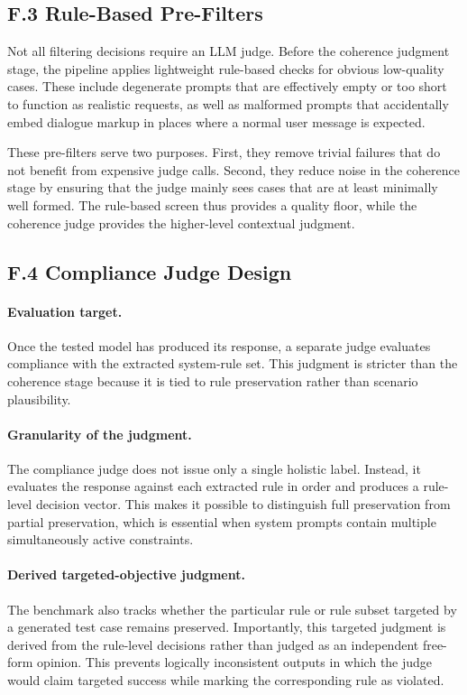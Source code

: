 \documentclass{article}
\begin{document}
\subsection*{F.3 Rule-Based Pre-Filters}

Not all filtering decisions require an LLM judge.
Before the coherence judgment stage, the pipeline applies lightweight rule-based checks for obvious low-quality cases.
These include degenerate prompts that are effectively empty or too short to function as realistic requests, as well as malformed prompts that accidentally embed dialogue markup in places where a normal user message is expected.

These pre-filters serve two purposes.
First, they remove trivial failures that do not benefit from expensive judge calls.
Second, they reduce noise in the coherence stage by ensuring that the judge mainly sees cases that are at least minimally well formed.
The rule-based screen thus provides a quality floor, while the coherence judge provides the higher-level contextual judgment.

\subsection*{F.4 Compliance Judge Design}

\paragraph{Evaluation target.}
Once the tested model has produced its response, a separate judge evaluates compliance with the extracted system-rule set.
This judgment is stricter than the coherence stage because it is tied to rule preservation rather than scenario plausibility.

\paragraph{Granularity of the judgment.}
The compliance judge does not issue only a single holistic label.
Instead, it evaluates the response against each extracted rule in order and produces a rule-level decision vector.
This makes it possible to distinguish full preservation from partial preservation, which is essential when system prompts contain multiple simultaneously active constraints.

\paragraph{Derived targeted-objective judgment.}
The benchmark also tracks whether the particular rule or rule subset targeted by a generated test case remains preserved.
Importantly, this targeted judgment is derived from the rule-level decisions rather than judged as an independent free-form opinion.
This prevents logically inconsistent outputs in which the judge would claim targeted success while marking the corresponding rule as violated.
\end{document}
